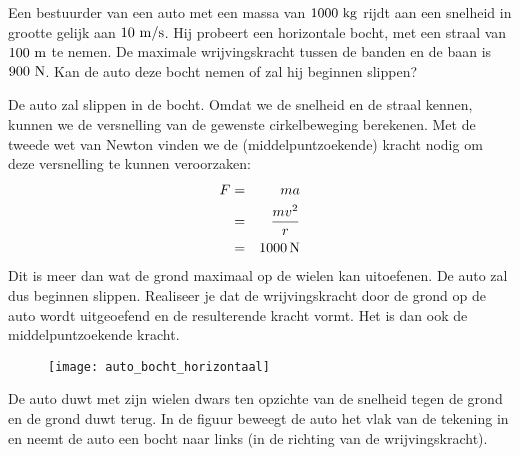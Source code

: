 \begin{exercise} Een bestuurder van een auto met een massa van $1000~\rm kg$ rijdt aan een snelheid in grootte gelijk aan $10~\rm m/s$. Hij probeert een horizontale bocht, met een straal van $100~\rm m$ te nemen. De maximale wrijvingskracht tussen de banden en de baan is $900~\rm N$. Kan de auto deze bocht nemen of zal hij beginnen slippen?
\begin{oplossing}
\newline
\newline
De auto zal slippen in de bocht. Omdat we de snelheid en de straal kennen, kunnen we de versnelling van de gewenste cirkelbeweging berekenen. Met de tweede wet van Newton vinden we de (middelpuntzoekende) kracht nodig om deze versnelling te kunnen veroorzaken:
\begin{eqnarray*}
F&=&ma\\
&=&\frac{mv^2}{r}\\
&=&1000\rm\,N
\end{eqnarray*}
Dit is meer dan wat de grond maximaal op de wielen kan uitoefenen. De auto zal dus beginnen slippen.
\newline
\newline
Realiseer je dat de wrijvingskracht door de grond op de auto wordt uitgeoefend en de resulterende kracht vormt. Het is dan ook de middelpuntzoekende kracht. 
\begin{figure}[h]
\centering\texttt{[image: auto\_bocht\_horizontaal]}
\end{figure}
De auto duwt met zijn wielen dwars ten opzichte van de snelheid tegen de grond en de grond duwt terug. In de figuur beweegt de auto het vlak van de tekening in en neemt de auto een bocht naar links (in de richting van de wrijvingskracht).
\end{oplossing}



\end{exercise}

